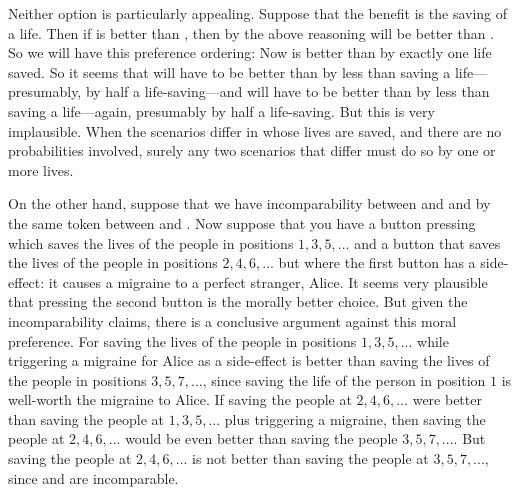 Neither option is particularly appealing. Suppose that the benefit is the saving of a life. Then if
 is better than , then by the above reasoning 
will be better than . So we will have this preference ordering:
Now  is better than  by exactly one life saved. So it seems that
 will have to be better than  by less than saving a life---presumably,
by half a life-saving---and  will have to be better than  by less than saving 
a life---again, presumably by half a life-saving. But this is very implausible. When the scenarios differ in 
whose lives are saved, and there are no probabilities involved, surely any two scenarios that differ must do 
so by one or more lives. 

On the other hand, suppose that we have incomparability between  and 
and by the same token between  and . Now suppose that you have 
a button pressing which saves the lives of the people in positions $1,3,5,...$ and a button that saves the 
lives of the people in positions $2,4,6,...$ but where the first button has a side-effect: it causes a 
migraine to a perfect stranger, Alice. It seems very plausible that pressing the second button is the 
morally better choice. But 
given the incomparability claims, there is a conclusive argument against this moral preference. For saving the
lives of the people in positions $1,3,5,...$ while triggering a migraine for Alice as a side-effect is 
better than saving the lives of the people in positions $3,5,7,...$, since saving the life of the person 
in position $1$ is well-worth the migraine to Alice. If saving the people at $2,4,6,...$ were better than
saving the people at $1,3,5,...$ plus triggering a migraine, then saving the people at $2,4,6,...$ would be
even better than saving the people $3,5,7,...$. But saving the people at $2,4,6,...$ is not better than
saving the people at $3,5,7,...$, since  and  are incomparable.

